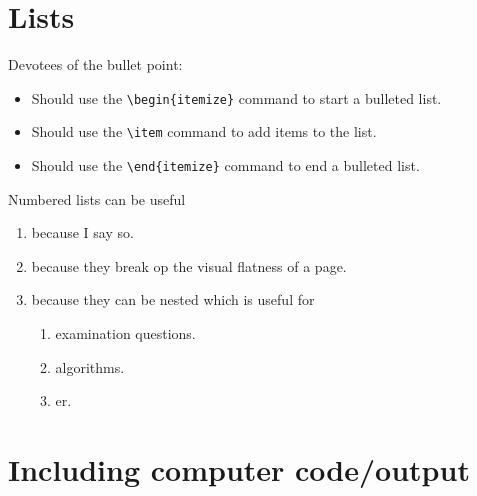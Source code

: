 \documentclass[11pt,a4paper]{article}
\begin{document}
\section{Lists}

Devotees of the bullet point:
\begin{itemize}
\item Should use the \verb+\begin{itemize}+ command to start a bulleted list.
\item Should use the \verb+\item+ command to add items to the list.
\item Should use the \verb+\end{itemize}+ command to end a bulleted list.
\end{itemize}

\noindent Numbered lists can be useful
\begin{enumerate}
\item because I say so.
\item because they break op the visual flatness of a page.
\item because they can be nested which is useful for
\begin{enumerate}
\item examination questions.
\item algorithms.
\item er.
\end{enumerate}
\end{enumerate}

\section{Including computer code/output}
\end{document}
